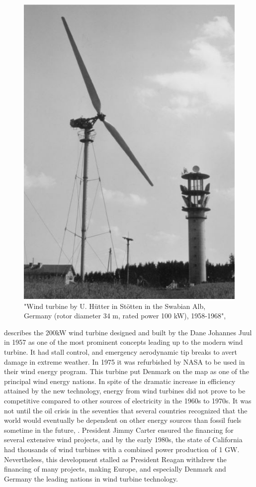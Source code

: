 \begin{figure}[H]
\centering
\includegraphics[scale=0.6]{figures/hutter}
\caption[$\; \:$Hûtter Wind Turbine Concept]{"Wind turbine by U. Hütter in Stötten in the Swabian Alb, Germany (rotor diameter 34 m, rated power 100 kW), 1958-1968", \cite{Hau2013} }
 \label{fig:hutter}
\end{figure}

\noindent \cite{Lynn2011} describes the 200kW wind turbine designed and built by the Dane Johannes Juul in 1957 as one of the most prominent concepts leading up to the modern wind turbine. It had stall control, and emergency aerodynamic tip breaks to avert damage in extreme weather. In 1975 it was refurbished by NASA to be used in their wind energy program. This turbine put Denmark on the map as one of the principal wind energy nations. 
\newline 
\newline
\noindent In spite of the dramatic increase in efficiency attained by the new technology, energy from wind turbines did not prove to be competitive compared to other sources of electricity in the 1960s to 1970s. It was not until the oil crisis in the seventies that several countries recognized that the world would eventually be dependent on other energy sources than fossil fuels sometime in the future, \cite{Wagner2013}.  President Jimmy Carter ensured the financing for several extensive wind projects, and by the early 1980s, the state of California had thousands of wind turbines with a combined power production of 1 GW. Nevertheless, this development stalled as President Reagan withdrew the financing of many projects, making Europe, and especially Denmark and Germany the leading nations in wind turbine technology. 
\cite{Lynn2011}

